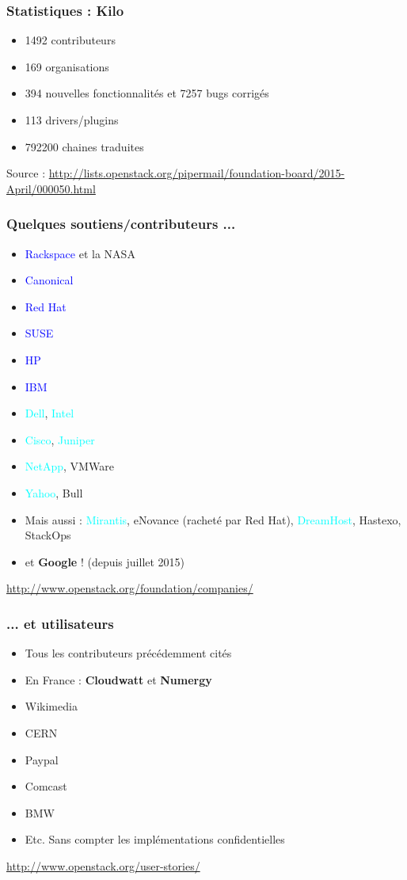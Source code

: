   \begin{frame}
    \frametitle{Statistiques : Kilo}
    \begin{itemize}
      \item 1492 contributeurs
      \item 169 organisations
      \item 394 nouvelles fonctionnalités et 7257 bugs corrigés
      \item 113 drivers/plugins
      \item 792200 chaines traduites
    \end{itemize}
    Source : \url{http://lists.openstack.org/pipermail/foundation-board/2015-April/000050.html}
  \end{frame}

  \begin{frame}
    \frametitle{Quelques soutiens/contributeurs ...}
    \begin{itemize}
      \item \textcolor{blue}{Rackspace} et la NASA\pause
      \item \textcolor{blue}{Canonical}
      \item \textcolor{blue}{Red Hat}
      \item \textcolor{blue}{SUSE}\pause
      \item \textcolor{blue}{HP}
      \item \textcolor{blue}{IBM}
      \item \textcolor{cyan}{Dell}, \textcolor{cyan}{Intel}
      \item \textcolor{cyan}{Cisco}, \textcolor{cyan}{Juniper}\pause
      \item \textcolor{cyan}{NetApp}, VMWare\pause
      \item \textcolor{cyan}{Yahoo}, Bull\pause
      \item Mais aussi : \textcolor{cyan}{Mirantis}, eNovance (racheté par Red Hat), \textcolor{cyan}{DreamHost}, Hastexo, StackOps\pause
      \item et \textbf{Google} ! (depuis juillet 2015)
    \end{itemize}
    \url{http://www.openstack.org/foundation/companies/}
  \end{frame}

  \begin{frame}
    \frametitle{... et utilisateurs}
    \begin{itemize}
      \item Tous les contributeurs précédemment cités\pause
      \item En France : \textbf{Cloudwatt} et \textbf{Numergy}\pause
      \item Wikimedia
      \item CERN
      \item Paypal
      \item Comcast
      \item BMW\pause
      \item Etc. Sans compter les implémentations confidentielles
    \end{itemize}
    \url{http://www.openstack.org/user-stories/}
  \end{frame}

